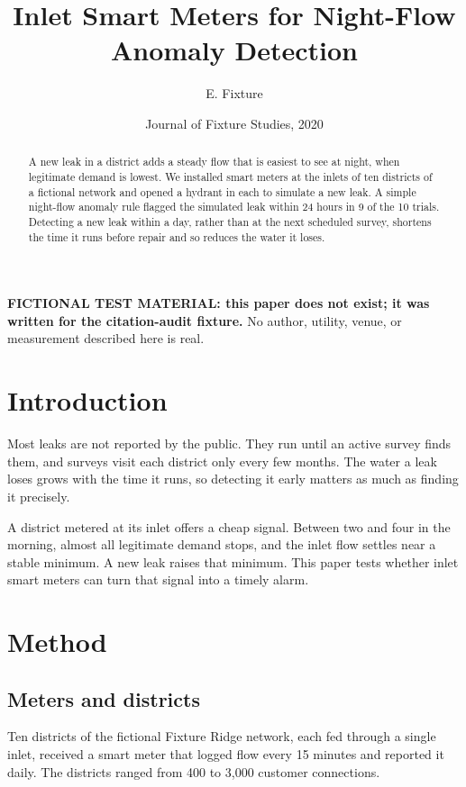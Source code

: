 \documentclass{article}
\title{Inlet Smart Meters for Night-Flow Anomaly Detection}
\author{E. Fixture}
\date{Journal of Fixture Studies, 2020}
\begin{document}
\maketitle

\noindent\textbf{FICTIONAL TEST MATERIAL: this paper does not exist; it was
written for the citation-audit fixture.} No author, utility, venue, or
measurement described here is real.

\begin{abstract}
A new leak in a district adds a steady flow that is easiest to see at night,
when legitimate demand is lowest. We installed smart meters at the inlets of
ten districts of a fictional network and opened a hydrant in each to simulate
a new leak. A simple night-flow anomaly rule flagged the simulated leak within
24 hours in 9 of the 10 trials. Detecting a new leak within a day, rather than
at the next scheduled survey, shortens the time it runs before repair and so
reduces the water it loses.
\end{abstract}

\section{Introduction}
\label{sec:introduction}

Most leaks are not reported by the public. They run until an active survey
finds them, and surveys visit each district only every few months. The water a
leak loses grows with the time it runs, so detecting it early matters as much
as finding it precisely.

A district metered at its inlet offers a cheap signal. Between two and four in
the morning, almost all legitimate demand stops, and the inlet flow settles
near a stable minimum. A new leak raises that minimum. This paper tests
whether inlet smart meters can turn that signal into a timely alarm.

\section{Method}
\label{sec:method}

\subsection{Meters and districts}
\label{sec:method-meters}

Ten districts of the fictional Fixture Ridge network, each fed through a single
inlet, received a smart meter that logged flow every 15 minutes and reported it
daily. The districts ranged from 400 to 3,000 customer connections.
\end{document}
